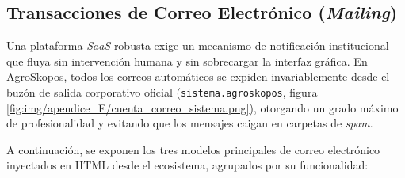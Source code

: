 \subsection{Transacciones de Correo Electrónico (\textit{Mailing})}\label{sec:mailing}
Una plataforma \textit{SaaS} robusta exige un mecanismo de notificación institucional que fluya sin intervención humana y sin sobrecargar la interfaz gráfica. En AgroSkopos, todos los correos automáticos se expiden invariablemente desde el buzón de salida corporativo oficial (\texttt{sistema.agroskopos}, figura \ref{fig:img/apendice_E/cuenta_correo_sistema.png}), otorgando un grado máximo de profesionalidad y evitando que los mensajes caigan en carpetas de \textit{spam}.


A continuación, se exponen los tres modelos principales de correo electrónico inyectados en HTML desde el ecosistema, agrupados por su funcionalidad:


